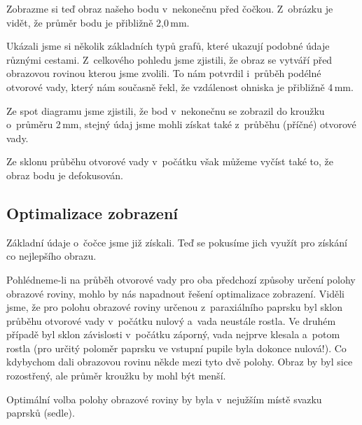 Zobrazme si teď obraz našeho bodu v~nekonečnu před čočkou. Z~obrázku je vidět,
že průměr bodu je přibližně 2{,}0\,mm.
%
%

Ukázali jsme si několik základních typů grafů, které ukazují podobné údaje
různými cestami. Z~celkového pohledu jsme zjistili, že obraz se vytváří před
obrazovou rovinou kterou jsme zvolili. To nám potvrdil i~průběh podélné
otvorové vady, který nám současně řekl, že vzdálenost ohniska je přibližně
4\,mm.

Ze spot diagramu jsme zjistili, že bod v~nekonečnu se zobrazil do kroužku
o~průměru 2\,mm, stejný údaj jsme mohli získat také z~průběhu (příčné) otvorové
vady.

Ze sklonu průběhu otvorové vady v~počátku však můžeme vyčíst také to, že obraz
bodu je defokusován.

\subsection{Optimalizace zobrazení}
\label{sing-optimalizace2}

Základní údaje o~čočce jsme již získali. Teď se pokusíme jich využít pro
získání co nejlepšího obrazu.

Pohlédneme-li na průběh otvorové vady pro oba předchozí způsoby určení polohy
obrazové roviny, mohlo by nás napadnout řešení optimalizace zobrazení. Viděli
jsme, že pro polohu obrazové roviny určenou z~paraxiálního paprsku byl sklon
průběhu otvorové vady v~počátku nulový a~vada neustále rostla. Ve druhém
případě byl sklon závislosti v~počátku záporný, vada nejprve klesala a~potom
rostla (pro určitý poloměr paprsku ve vstupní pupile byla dokonce nulová!). Co
kdybychom dali obrazovou rovinu někde mezi tyto dvě polohy. Obraz by byl sice
rozostřený, ale průměr kroužku by mohl být menší.

Optimální volba polohy obrazové roviny by byla v~nejužším místě svazku paprsků
(sedle).
